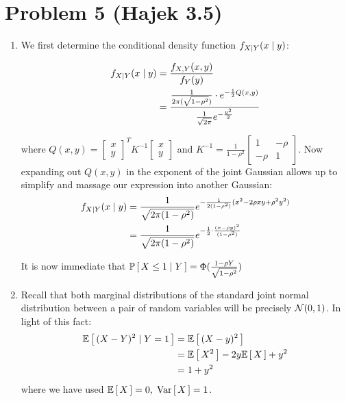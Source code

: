 \documentclass[12pt]{article}%
\begin{document}
\section{Problem 5 (Hajek 3.5)}
\begin{enumerate}
  \item We first determine the conditional density function $\condPDF{X}{Y}$:

  \def \xyvec{\begin{bmatrix} x \\ y \end{bmatrix}}
  \def \GaussExpon{e^{- \frac{1}{2} Q(x,y)}}
  \def \JointDen{\frac{1}{2\pi(\sqrt{1-\rho^2})}\cdot \GaussExpon}
  \def \MarginalDen{{\frac{1}{\sqrt{2\pi}} e^{-\frac{y^2}{2}}}}

  \begin{align*}
      \condPDF{X}{Y} & = \frac{\jointPDF{X}{Y}}{f_Y(y)} \\
                     & = \frac{\JointDen}{\MarginalDen}
  \end{align*}

  where $Q(x,y) = \xyvec^T K^{-1} \xyvec$ and $K^{-1} = \frac{1}{1 - \rho^2} \begin{bmatrix}
    1 & -\rho \\ -\rho & 1
  \end{bmatrix}$. Now expanding out $Q(x,y)$ in the exponent of the joint Gaussian allows up to simplify and massage our expression into another Gaussian:
  \begin{align*}
  \condPDF{X}{Y} & = \frac{1}{\sqrt{2\pi(1-\rho^2)}} e^{-\frac{1}{2(1-\rho^2)} (x^2 - 2\rho xy + \rho^2y^2)} \\
  & = \frac{1}{\sqrt{2\pi(1-\rho^2)}} e^{-\frac{1}{2}\cdot \frac{(x - \rho y)^2}{(1 - \rho^2)}}
  \end{align*}

  It is now immediate that $\mathbb{P}\left[\,X \leq 1 \mid Y\,\right] = \Phi(\frac{1 - \rho Y}{\sqrt{1 - \rho^2}})$

  \item
  Recall that both marginal distributions of the standard joint normal distribution between a pair of random variables will be precisely $\mathcal{N}(0,1)$. In light of this fact:
  \begin{align*}
    \mathbb{E}\left[\,{(X-Y)^2}\mid {Y=1}\,\right] & = \mathbb{E}\left[\,(X-y)^2\,\right] \\
                           & = \mathbb{E}\left[\,X^2\,\right] - 2y\mathbb{E}\left[\,X\,\right] + y^2 \\
                           & =  1 + y^2
  \end{align*}
  where we have used $\mathbb{E}\left[\,X\,\right] = 0, \; \text{Var}\left[\,X\,\right] = 1$.
\end{enumerate}
\end{document}

